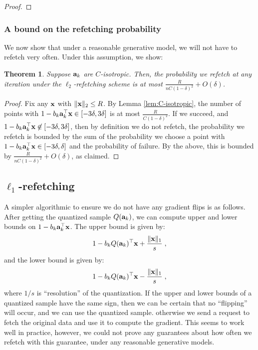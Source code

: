 \documentclass{article}
\def\a{{\bf a}}
\def\g{{\bf g}}
\def\x{{\bf x}}
\def\E{\mathbb{E}}
\newtheorem{theorem}{Theorem}
\begin{document}
\begin{proof}
%
\end{proof}

\subsubsection{A bound on the refetching probability}
We now show that under a reasonable generative model, we will not have to refetch very often.
Under this assumption, we show:
\begin{theorem}
Suppose $\a_k$ are $C$-isotropic.
Then, the probability we refetch at any iteration under the $\ell_2$-refetching scheme is at most $\frac{R}{n C(1 - \delta)^2} + O(\delta)$.
\end{theorem}
\begin{proof}
Fix any $\x$ with $\| \x \|_2 \leq R$.
By Lemma \ref{lem:C-isotropic}, the number of points with $1 - b_k \a_k^\top \x \in [-3 \delta, 3\delta]$ is at most $\frac{R}{C(1 - \delta)^2} $.
If we succeed, and $1 - b_k \a_k^\top \x \not\in [-3 \delta, 3\delta]$, then by definition we do not refetch, the probability we refetch is bounded by the sum of the probability we choose a point with $1 - b_k \a_k^\top \x \in [-3 \delta, \delta]$ and the probability of failure.
By the above, this is bounded by $\frac{R}{n C(1 - \delta)^2} + O(\delta)$, as claimed.
\end{proof}

\subsection{$\ell_1$-refetching}
A simpler algorithmic to ensure we do not have any gradient flips is as follows.
After getting the quantized sample $Q(\a_k)$, we can compute  upper and lower bounds on $1 - b_k \a_k^\top \x$. 
The upper bound is given by:
\[1 - b_k Q(\a_k)^\top \x + \frac{\| \x \|_1}{s} \; ,
\]
and the lower bound is given by:
\[1 - b_k Q(\a_k)^\top \x - \frac{\| \x \|_1}{s} \; ,
\]
where $1/s$ is ``resolution'' of the quantization.
If the upper and lower bounds of a quantized sample have the same sign, then we can be certain that  no ``flipping'' will occur, and we can use the quantized sample. otherwise we send a request to fetch the original data and use it to  compute the gradient.
This seems to work well in practice, however, we could not prove any guarantees about how often we refetch with this guarantee, under any reasonable generative models.
\end{document}
